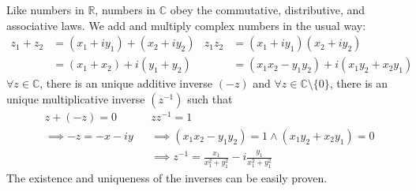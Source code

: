 \documentclass[12pt, english]{book}
\begin{document}
	\begin{center}
	\end{center}
	Like numbers in $\mathbb{R}$, numbers in $\mathbb{C}$ obey the commutative, distributive, and associative laws. We add and multiply complex numbers in the usual way: 
	\begin{align*}
		z_1 + z_2 &= (x_1 + iy_1) + (x_2 + iy_2) & z_1 z_2 &= (x_1 + iy_1) (x_2 + iy_2) \\
			&= (x_1 + x_2) + i(y_1 + y_2) & &=(x_1 x_2 - y_1 y_2) + i(x_1 y_2 + x_2 y_1)
	\end{align*}
	$\forall z \in \mathbb{C}$, there is an unique additive inverse $(-z)$ and $\forall z \in \mathbb{C}\setminus\{0\}$, there is an unique multiplicative inverse $(z^{-1})$ such that 
	\begin{align*}
		&z + (-z) = 0  & &zz^{-1} = 1 \\
		&\implies -z = -x - iy & &\implies (x_1 x_2 - y_1 y_2) = 1 \land (x_1 y_2 + x_2 y_1) = 0 \\
		& & &\implies z^{-1} = \frac{x_1}{x_1^2 + y_1^2} - i \frac{y_1}{x_1^2 + y_1^2}
	\end{align*}
	The existence and uniqueness of the inverses can be easily proven. 
	
\end{document}

